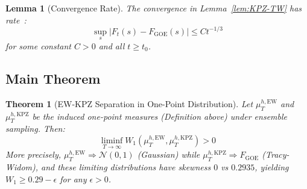 \documentclass[aps,pre,reprint,amsmath,amssymb,superscriptaddress]{revtex4-2}
\newtheorem{theorem}{Theorem}
\newtheorem{lemma}{Lemma}
\newcommand{\EW}{\text{EW}}
\newcommand{\KPZ}{\text{KPZ}}
\begin{document}
\begin{lemma}[Convergence Rate]
\label{lem:rate}
The convergence in Lemma~\ref{lem:KPZ-TW} has rate~\cite{FerrariSpohn2006}:
\begin{equation}
\sup_s |F_t(s) - F_{\text{GOE}}(s)| \leq C t^{-1/3}
\end{equation}
for some constant $C > 0$ and all $t \geq t_0$.
\end{lemma}

\subsection{Main Theorem}

\begin{theorem}[EW-KPZ Separation in One-Point Distribution]
\label{thm:skewness-separation}
Let $\mu^{h,\EW}_T$ and $\mu^{h,\KPZ}_T$ be the induced one-point measures (Definition above) under ensemble sampling. Then:
\begin{equation}
\liminf_{T \to \infty} W_1\left(\mu^{h,\EW}_{T}, \mu^{h,\KPZ}_{T}\right) > 0
\end{equation}
More precisely, $\mu^{h,\EW}_T \Rightarrow \mathcal{N}(0,1)$ (Gaussian) while $\mu^{h,\KPZ}_T \Rightarrow F_{\text{GOE}}$ (Tracy-Widom), and these limiting distributions have skewness $0$ vs $0.2935$, yielding $W_1 \geq 0.29 - \epsilon$ for any $\epsilon > 0$.
\end{theorem}
\end{document}
